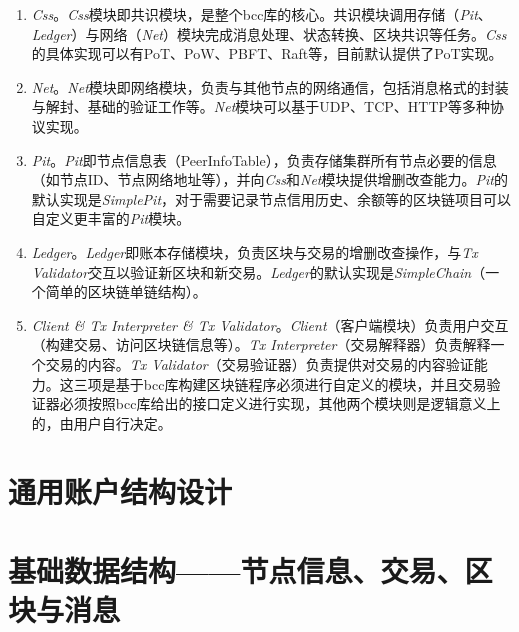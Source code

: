 \begin{enumerate}
    \item \textit{Css}。\textit{Css}模块即共识模块，是整个bcc库的核心。共识模块调用存储（\textit{Pit}、\textit{Ledger}）与网络（\textit{Net}）模块完成消息处理、状态转换、区块共识等任务。\textit{Css}的具体实现可以有PoT、PoW、PBFT、Raft等，目前默认提供了PoT实现。
	\item \textit{Net}。\textit{Net}模块即网络模块，负责与其他节点的网络通信，包括消息格式的封装与解封、基础的验证工作等。\textit{Net}模块可以基于UDP、TCP、HTTP等多种协议实现。
	\item \textit{Pit}。\textit{Pit}即节点信息表（PeerInfoTable），负责存储集群所有节点必要的信息（如节点ID、节点网络地址等），并向\textit{Css}和\textit{Net}模块提供增删改查能力。\textit{Pit}的默认实现是\textit{SimplePit}，对于需要记录节点信用历史、余额等的区块链项目可以自定义更丰富的\textit{Pit}模块。
	\item \textit{Ledger}。\textit{Ledger}即账本存储模块，负责区块与交易的增删改查操作，与\textit{Tx Validator}交互以验证新区块和新交易。\textit{Ledger}的默认实现是\textit{SimpleChain}（一个简单的区块链单链结构）。
	\item \textit{Client \& Tx Interpreter \& Tx Validator}。\textit{Client}（客户端模块）负责用户交互（构建交易、访问区块链信息等）。\textit{Tx Interpreter}（交易解释器）负责解释一个交易的内容。\textit{Tx Validator}（交易验证器）负责提供对交易的内容验证能力。这三项是基于bcc库构建区块链程序必须进行自定义的模块，并且交易验证器必须按照bcc库给出的接口定义进行实现，其他两个模块则是逻辑意义上的，由用户自行决定。%
\end{enumerate}


\section{通用账户结构设计}

\section{基础数据结构——节点信息、交易、区块与消息}

